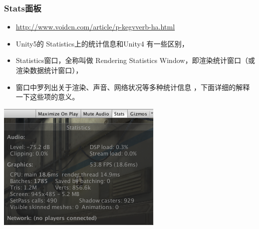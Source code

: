 \documentclass[9pt, b5paper]{article}
\begin{document}
\subsubsection{Stats面板}
\label{sec:orgaa0281d}
\begin{itemize}
\item \url{http://www.voidcn.com/article/p-kegvverb-ha.html}
\item Unity5的 Statistics上的统计信息和Unity4 有一些区别，
\item Statistics窗口，全称叫做 Rendering Statistics Window，即渲染统计窗口（或渲染数据统计窗口），
\item 窗口中罗列出关于渲染、声音、网络状况等多种统计信息 ，下面详细的解释一下这些项的意义。
\end{itemize}

\begin{center}
\includegraphics[width=.9\linewidth]{./pic/stats.png}
\end{center}
\end{document}

